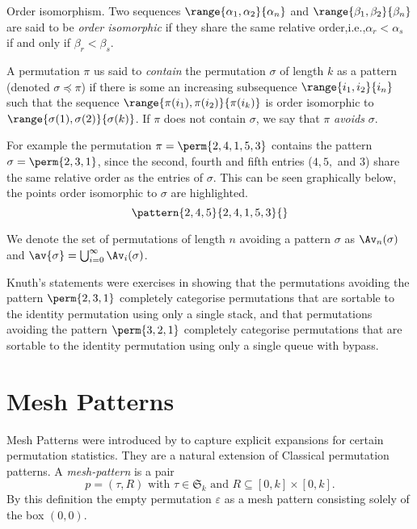 \begin{definition}{Order isomorphism.}
    Two sequences \(\range{\alpha_1,\alpha_2}{\alpha_n}\) and
    \(\range{\beta_1,\beta_2}{\beta_n}\) are said to be \emph{order isomorphic}
    if they share the same relative order,i.e.,\(\alpha_r<\alpha_s\) if and
    only if \(\beta_r<\beta_s\).
\end{definition}

A permutation \(\pi\) us said to \emph{contain} the permutation \(\sigma\) of
length \(k\) as a pattern (denoted \(\sigma \preceq \pi\)) if there is some
an increasing subsequence \(\range{i_1,i_2}{i_n}\) such that the sequence
\(\range{\pi(i_1),\pi(i_2)}{\pi(i_k)}\) is order isomorphic to
\(\range{\sigma(1),\sigma(2)}{\sigma(k)}\). If \(\pi\) does not contain
\(\sigma\), we say that \(\pi\) \emph{avoids} \(\sigma\).

For example the permutation \(\pi = \perm{2,4,1,5,3}\) contains the pattern
\(\sigma = \perm{2,3,1}\), since the second, fourth and fifth entries
(\(4,5,\) and \(3\)) share the same relative order as the entries of \(\sigma\).
This can be seen graphically below, the points order isomorphic to \(\sigma\)
are highlighted.
\begin{equation*}
    \pattern{2,4,5}{2,4,1,5,3}{}
\end{equation*}

We denote the set of permutations of length \(n\) avoiding a pattern \(\sigma\)
as \(\Av_n(\sigma)\) and \(\av{\sigma} = \bigcup_{i=0}^{\infty}\Av_i(\sigma)\).

Knuth's statements were exercises in showing that the permutations avoiding the
pattern \(\perm{2,3,1}\) completely categorise permutations that are sortable to
the identity permutation using only a single stack, and that permutations avoiding the
pattern \(\perm{3,2,1}\) completely categorise permutations that are sortable to
the identity permutation using only a single queue with bypass.

\section{Mesh Patterns}
Mesh Patterns were introduced by \textcite{journals/combinatorics/BrandenC11} to capture explicit expansions
for certain permutation statistics. They are a natural extension of Classical
permutation patterns. A \emph{mesh-pattern} is a pair
\begin{equation*}
    p = (\tau,R)\text{ with } \tau \in \mathfrak{S}_k \text{ and } R \subseteq
    [0,k]\times [0,k].
\end{equation*}
By this definition the empty permutation \(\varepsilon\) as a mesh pattern consisting solely of the
box \((0,0)\).

